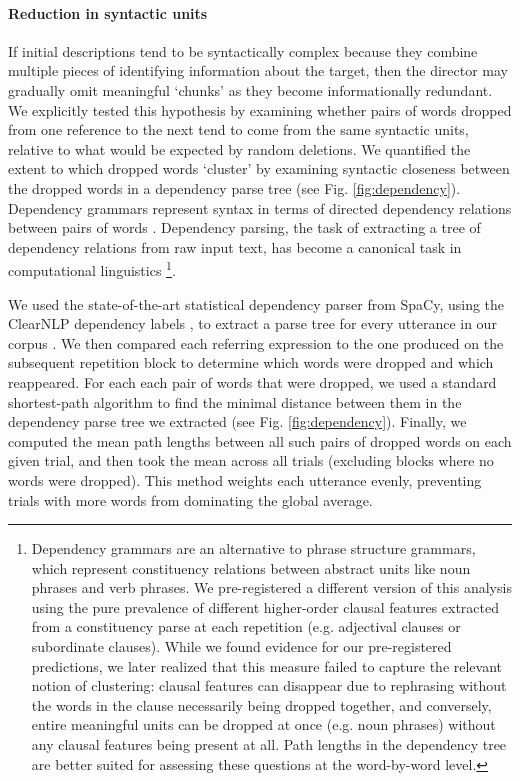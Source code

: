 \documentclass[alpha-refs]{wiley-article}
\begin{document}
\paragraph{Reduction in syntactic units}
If initial descriptions tend to be syntactically complex because they combine multiple pieces of identifying information about the target, then the director may gradually omit meaningful `chunks' as they become informationally redundant.
We explicitly tested this hypothesis by examining whether pairs of words dropped from one reference to the next tend to come from the same syntactic units, relative to what would be expected by random deletions.
We quantified the extent to which dropped words `cluster' by examining syntactic closeness between the dropped words in a dependency parse tree (see Fig. \ref{fig:dependency}).
Dependency grammars represent syntax in terms of directed dependency relations between pairs of words \citep{hudson1984word,corbett1993heads}. 
Dependency parsing, the task of extracting a tree of dependency relations from raw input text, has become a canonical task in computational linguistics \citep{jurafsky2014speech,kubler2009dependency}\footnote{Dependency grammars are an alternative to phrase structure grammars, which represent constituency relations between abstract units like noun phrases and verb phrases. We pre-registered a different version of this analysis using the pure prevalence of different higher-order clausal features extracted from a constituency parse at each repetition (e.g. adjectival clauses or subordinate clauses). While we found evidence for our pre-registered predictions, we later realized that this measure failed to capture the relevant notion of clustering: clausal features can disappear due to rephrasing without the words in the clause necessarily being dropped together, and conversely, entire meaningful units can be dropped at once (e.g. noun phrases) without any clausal features being present at all. Path lengths in the dependency tree are better suited for assessing these questions at the word-by-word level.}. 

We used the state-of-the-art statistical dependency parser from SpaCy, using the ClearNLP dependency labels \citep{choi_palmer2012}, to extract a parse tree for every utterance in our corpus \citep[see][for details on neural network architectures for parsing]{honnibal2015improved, kiperwasser2016simple}.
We then compared each referring expression to the one produced on the subsequent repetition block to determine which words were dropped and which reappeared.
For each each pair of words that were dropped, we used a standard shortest-path algorithm to find the minimal distance between them in the dependency parse tree we extracted (see Fig. \ref{fig:dependency}).
Finally, we computed the mean path lengths between all such pairs of dropped words on each given trial, and then took the mean across all trials (excluding blocks where no words were dropped).
This method weights each utterance evenly, preventing trials with more words from dominating the global average.
\end{document}
